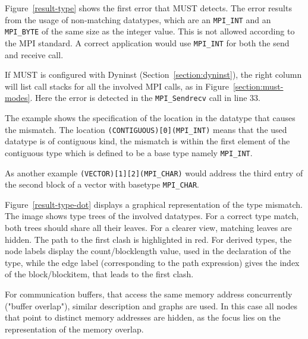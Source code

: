 \documentclass[english]{scrartcl}
\begin{document}
Figure~\ref{result-type} shows the first error that MUST detects. The error
results from the usage of non-matching datatypes, which are an \texttt{MPI\_INT}
and an \texttt{MPI\_BYTE} of the same size as the integer value. This is not
allowed according to the MPI standard. A correct application would use
\texttt{MPI\_INT} for both the send and receive call.

If MUST is configured with Dyninst (Section~\ref{section:dyninst}), the right
column will list call stacks for all the involved MPI calls, as in
Figure~\ref{section:must-modes}. 
Here the 
error is detected in the \texttt{MPI\_Sendrecv} call in line 33.

The example shows the specification of the location in the datatype that causes
the mismatch. 
The location \texttt{(CONTIGUOUS)[0](MPI\_INT)} means that the used
datatype is of contiguous kind, the mismatch is within the first element of the
contiguous type which is defined to be a base type namely \texttt{MPI\_INT}.

As another example \texttt{(VECTOR)[1][2](MPI\_CHAR)} would address the third
entry of the second block of a vector with basetype \texttt{MPI\_CHAR}.

Figure~\ref{result-type-dot} displays a graphical representation of the type
mismatch. The image shows type trees of the involved datatypes. For a correct type match,
both trees should share all their leaves. For a clearer view, matching leaves
are hidden. The path to the first clash is highlighted in red.
For derived types, the node labels display the count/blocklength value, 
used in the 
declaration of the type, while the edge label (corresponding to the path expression) 
gives the index of the block/blockitem, that leads to the first clash. 

For communication buffers, that access the same memory address concurrently
("buffer overlap"), similar description and graphs are used. In this case all nodes that point 
to distinct memory addresses are hidden, as the focus lies on the
representation of the memory overlap.
\end{document}
